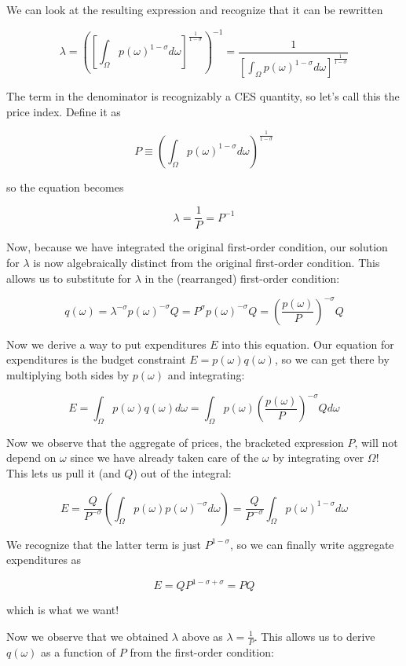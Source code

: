 \documentclass[12pt, letterpaper]{article}
\begin{document}
	We can look at the resulting expression and recognize that it can be rewritten

	\[ \lambda = \left(\left[ \int_{\Omega} p(\omega)^{1 - \sigma} d\omega \right]^{\frac{1}{1 - \sigma}}\right)^{-1} = \frac{1}{\left[ \int_{\Omega} p(\omega)^{1 - \sigma} d\omega \right]^{\frac{1}{1 - \sigma}}}  \]

	The term in the denominator is recognizably a CES quantity, so let's call this the price index. Define it as

	\[ P \equiv \left( \int_{\Omega} p(\omega)^{1 - \sigma} d\omega \right)^{\frac{1}{1 - \sigma}}  \]

	so the equation becomes

	\[ \lambda = \frac{1}{P} = P^{-1} \]

	Now, because we have integrated the original first-order condition, our solution for \(\lambda\) is now algebraically distinct from the original first-order condition. This allows us to substitute for \(\lambda\) in the (rearranged) first-order condition:

	\[ q(\omega) = \lambda^{-\sigma} p(\omega)^{-\sigma} Q = P^{\sigma} p(\omega)^{-\sigma} Q = \left(\frac{p(\omega)}{P}\right)^{-\sigma} Q    \]

	Now we derive a way to put expenditures \(E\) into this equation. Our equation for expenditures is the budget constraint \(E = p(\omega) q(\omega)\), so we can get there by multiplying both sides by \(p(\omega)\) and integrating:
	
	\[ E = \int_{\Omega} p(\omega) q(\omega) d\omega = \int_{\Omega} p(\omega) \left(\frac{p(\omega)}{P}\right)^{-\sigma} Q  d\omega   \]
	
	Now we observe that the aggregate of prices, the bracketed expression \( P \), will not depend on \(\omega\) since we have already taken care of the \(\omega\) by integrating over \(\Omega\)! This lets us pull it (and \(Q\)) out of the integral:

	\[ E = \frac{Q}{P^{-\sigma}} \left( \int_{\Omega} p(\omega) p(\omega)^{-\sigma} d\omega \right) = \frac{Q}{P^{-\sigma}} \int_{\Omega} p(\omega)^{1 -\sigma} d\omega \]

	We recognize that the latter term is just \( P^{1 - \sigma}  \), so we can finally write aggregate expenditures as

	\[ E = Q P^{1 - \sigma + \sigma} = P Q   \]

	which is what we want!

	Now we observe that we obtained \(\lambda\) above as \(\lambda = \frac{1}{P}\). This allows us to derive \(q(\omega)\) as a function of \(P\) from the first-order condition: 
\end{document}
